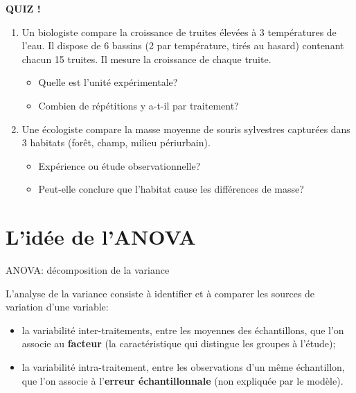 \documentclass{BeamerTemplate}
\begin{document}
\begin{frame}[plain,t]
  \centerline{\LARGE\bfseries\alert{QUIZ !}}

  \medskip
  \begin{enumerate}\itemsep 1.4cm
    \item Un biologiste compare la croissance de truites élevées à 3 températures
    de l'eau. Il dispose de 6 bassins (2 par température, tirés au hasard) contenant
    chacun 15 truites. Il mesure la croissance de chaque truite.
    \begin{itemize}
      \item Quelle est l'unité expérimentale?
      \item Combien de répétitions y a-t-il par traitement?
    \end{itemize}
    \item Une écologiste compare la masse moyenne de souris sylvestres capturées
    dans 3 habitats (forêt, champ, milieu périurbain).
    \begin{itemize}
      \item Expérience ou étude observationnelle?
      \item Peut-elle conclure que l'habitat \alert{cause} les différences de masse?
    \end{itemize}
  \end{enumerate}
\end{frame}

\section{L'idée de l'ANOVA}

\begin{frame}[t]{ANOVA: décomposition de la variance}

L'analyse de la variance consiste à identifier et à comparer les
\alert{sources de variation} d'une variable:

\medskip

\begin{itemize}\itemsep3mm
  \item<2-> la variabilité \alert{inter-traitements}, entre les moyennes des
  échantillons, que l'on associe au \textbf{facteur} (la caractéristique qui
  distingue les groupes à l'étude);
  \item<3-> la variabilité \alert{intra-traitement}, entre les observations d'un
  même échantillon, que l'on associe à l'\textbf{erreur échantillonnale}
  (non expliquée par le modèle).
\end{itemize}

\end{frame}
\end{document}
